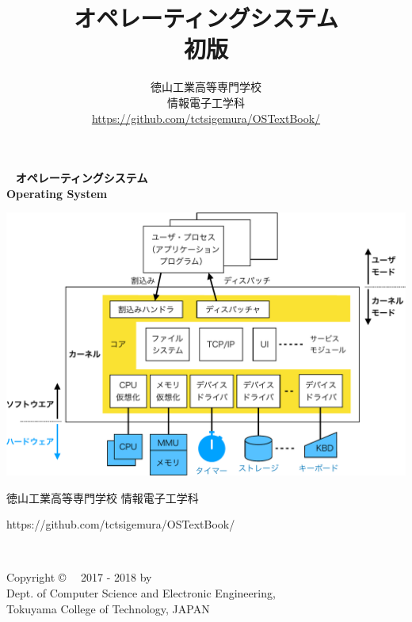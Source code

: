 \documentclass[a4paper,11pt,twocolumn]{ltjsbook}     %
\newcommand{\ver}{初版}
\begin{document}
\setcounter{page}{0}
\thispagestyle{empty}
\onecolumn
~
\vfill
\vfill
{\noindent
\fontsize{34pt}{50pt}\selectfont\textbf{オペレーティングシステム}\\
\fontsize{34pt}{50pt}\selectfont\textbf{Operating System}
}
\vfill
\vfill
\centerline{
  \includegraphics[scale=0.77]{Fig/osOrganization-crop.pdf}
}
\vfill
\vfill
\centerline{\Large 徳山工業高等専門学校 情報電子工学科}
\centerline{\Large\ttfamily https://github.com/tctsigemura/OSTextBook/}
\vfill

\frontmatter
\title{オペレーティングシステム\\{\ver}}
\author{徳山工業高等専門学校\\情報電子工学科\\
\url{https://github.com/tctsigemura/OSTextBook/}}
\date{}
\maketitle

\thispagestyle{empty}
\onecolumn
~
\vfill
\begin{flushleft}
Copyright \copyright ~~ 2017 - 2018 by \\
Dept. of Computer Science and Electronic Engineering, \\
Tokuyama College of Technology, JAPAN
\end{flushleft}
\vspace{0.8cm}
\end{document}
